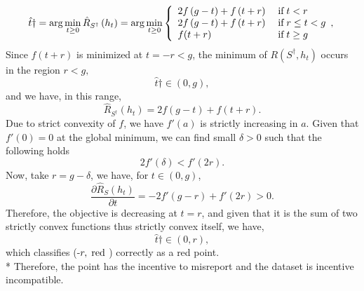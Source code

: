 \documentclass{article}
\begin{document}
\begin{equation} \hat{t}\dagger = \arg\displaystyle\min_{t \geq  0} \hat{R}_{S^{\dagger}}\left(h_{t}\right) = \arg\displaystyle\min_{t \geq  0}\left\{ \begin{array}{ll}
2 f\left(g - t\right) + f\left(t + r\right)& \text{\;if\;} t < r \\
2 f\left(g - t\right) + f\left(t + r\right)& \text{\;if\;} r \leq  t < g \\
f(t + r)& \text{\;if\;} t \geq  g \\
\end{array},\right. \end{equation}
Since $f\left(t + r\right) $ is minimized at $t  = -r < g $, the minimum of $R\left(S^{\dagger}, h_{t}\right) $ occurs in the region $r  < g, $
\begin{equation} 
\hat{t}\dagger \in \left(0, g \right),
\end{equation}
and we have, in this range,
\begin{equation} 
\hat{R}_{S^{\dagger}}\left(h_{t}\right) = 2 f\left(g - t\right) + f\left(t + r\right).
\end{equation}
Due to strict convexity of $f $, we have $f'\left(a\right)$ is strictly increasing in $a $. Given that $f'\left(0\right) = 0$ at the global minimum, we can find small $\delta > 0$ such that the following holds
\begin{equation} 
2 f'\left(\delta\right) < f'\left(2 r\right) .
\end{equation}
Now, take $r  = g - \delta$, we have, for $t  \in \left(0, g \right)$,
\begin{equation} 
\dfrac{\partial \hat{R}_{S}\left(h_{t}\right)}{\partial t} = - 2 f'\left(g - r\right) + f'\left(2 r\right) > 0.
\end{equation}
Therefore, the objective is decreasing at $t  = r $, and given that it is the sum of two strictly convex functions thus strictly convex itself, we have,
\begin{equation} 
\hat{t}\dagger \in \left(0, r \right),
\end{equation}
which classifies (-$r , \text{\;red\;}$) correctly as a red point.
\\* Therefore, the point has the incentive to misreport and the dataset is incentive incompatible.
\newline \newline
\end{document}
